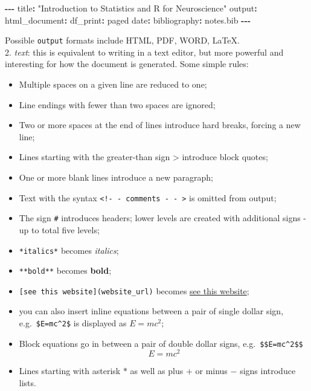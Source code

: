 \documentclass[
]{article}
\newenvironment{Shaded}{\begin{snugshade}}{\end{snugshade}}
\newcommand{\NormalTok}[1]{#1}
\newcommand{\SpecialCharTok}[1]{\textcolor[rgb]{0.81,0.36,0.00}{\textbf{#1}}}
\newcommand{\StringTok}[1]{\textcolor[rgb]{0.31,0.60,0.02}{#1}}
\providecommand{\tightlist}{%
  \setlength{\itemsep}{0pt}\setlength{\parskip}{0pt}}
\begin{document}
\begin{Shaded}
\begin{Highlighting}[]
\SpecialCharTok{{-}{-}{-}}
\NormalTok{title}\SpecialCharTok{:} \StringTok{"Introduction to Statistics and R for Neuroscience"}
\NormalTok{output}\SpecialCharTok{:}
\NormalTok{html\_document}\SpecialCharTok{:}
\NormalTok{    df\_print}\SpecialCharTok{:}\NormalTok{ paged}
\NormalTok{date}\SpecialCharTok{:} \StringTok{\textquotesingle{}\textquotesingle{}}
\NormalTok{bibliography}\SpecialCharTok{:}\NormalTok{ notes.bib}
\SpecialCharTok{{-}{-}{-}}
\end{Highlighting}
\end{Shaded}

Possible \texttt{output} formats include HTML, PDF, WORD, LaTeX.\\
2. \emph{text}: this is equivalent to writing in a text editor, but more
powerful and interesting for how the document is generated. Some simple
rules:

\begin{itemize}
\tightlist
\item
  Multiple spaces on a given line are reduced to one;
\item
  Line endings with fewer than two spaces are ignored;
\item
  Two or more spaces at the end of lines introduce hard breaks, forcing
  a new line;
\item
  Lines starting with the greater-than sign \textgreater{} introduce
  block quotes;
\item
  One or more blank lines introduce a new paragraph;
\item
  Text with the syntax
  \texttt{\textless{}!-\ -\ comments\ -\ -\ \textgreater{}} is omitted
  from output;
\item
  The sign \texttt{\#} introduces headers; lower levels are created with
  additional signs - up to total five levels;
\item
  \texttt{*italics*} becomes \emph{italics};
\item
  \texttt{**bold**} becomes \textbf{bold};
\item
  \texttt{{[}see\ this\ website{]}(website\_url)} becomes
  \href{website_url}{see this website};
\item
  you can also insert inline equations between a pair of single dollar
  sign, e.g.~\texttt{\$E=mc\^{}2\$} is displayed as \(E=mc^2\);
\item
  Block equations go in between a pair of double dollar signs,
  e.g.~\texttt{\$\$E=mc\^{}2\$\$} \[E=mc^2\]
\item
  Lines starting with asterisk \(*\) as well as plus \(+\) or minus
  \(-\) signs introduce lists.
\end{itemize}
\end{document}
